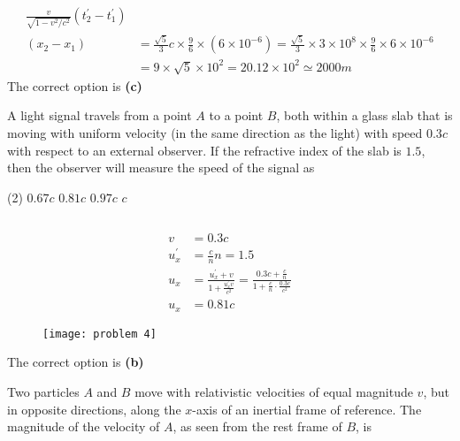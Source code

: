 \begin{enumerate}
\begin{answer}
\begin{align*}
\frac{v}{\sqrt{1-v^{2} / c^{2}}}\left(t_{2}^{\prime}-t_{1}^{\prime}\right)\\
\left(x_{2}-x_{1}\right)&=\frac{\sqrt{5}}{3} c \times \frac{9}{6} \times\left(6 \times 10^{-6}\right)=\frac{\sqrt{5}}{3} \times 3 \times 10^{8} \times \frac{9}{6} \times 6 \times 10^{-6}\\
&=9 \times \sqrt{5} \times 10^{2}=20.12 \times 10^{2} \simeq 2000 m
\end{align*}
The correct option is \textbf{(c)}
\end{answer}
\begin{minipage}{\textwidth}
	\item A light signal travels from a point $A$ to a point $B$, both within a glass slab that is moving with uniform velocity (in the same direction as the light) with speed $0.3 c$ with respect to an external observer. If the refractive index of the slab is $1.5$, then the observer will measure the speed of the signal as
\end{minipage}
\begin{tasks}(2)
	\task[\textbf{A.}] $0.67 c$
	\task[\textbf{B.}]$0.81 c$
	\task[\textbf{C.}]$0.97 c$
	\task[\textbf{D.}] $c$
\end{tasks}
\begin{answer}$\left. \right. $\\
	\begin{minipage}{0.5\textwidth}
\begin{align*}
v&=0.3 c\\
u_{x}^{\prime}&=\frac{c}{n} n=1.5\\
u_{x}&=\frac{u_{x}^{\prime}+v}{1+\frac{u_{x}^{\prime} v}{c^{2}}}=\frac{0.3 c+\frac{c}{n}}{1+\frac{c}{n} \cdot \frac{0.3 c}{c^{2}}}\\
u_{x}&=0.81 c
\end{align*}
	\end{minipage}
\begin{minipage}{0.5\textwidth}
\begin{figure}[H]
	\centering
	\texttt{[image: problem 4]}
\end{figure}
\end{minipage}
The correct option is \textbf{(b)}
\end{answer}
\begin{minipage}{\textwidth}
	\item Two particles $A$ and $B$ move with relativistic velocities of equal magnitude $v$, but in opposite directions, along the $x$-axis of an inertial frame of reference. The magnitude of the velocity of $A$, as seen from the rest frame of $B$, is

\end{minipage}
\end{enumerate}
